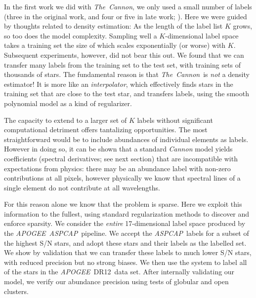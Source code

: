 \documentclass[12pt,preprint]{aastex}
\newcommand{\project}[1]{\textsl{#1}}
\newcommand{\TheCannon}{\project{The~Cannon}}
\newcommand{\acronym}[1]{{\small{#1}}}
\newcommand{\apogee}{\project{\acronym{APOGEE}}}
\newcommand{\aspcap}{\project{\acronym{ASPCAP}}}
\newcommand{\dr}{\acronym{DR12}}
\begin{document}





In the first work we did with \TheCannon, we only used a small number of labels
(three in the original work, and four or five in late work; \citealt{tc, age}). 
Here we were guided by thoughts related to density estimation: As the length of 
the label list $K$ grows, so too does the model complexity.  Sampling well a 
$K$-dimensional label space takes a training set the size of which scales 
exponentially (or worse) with $K$.  Subsequent experiments, however, did not 
bear this out. We found that we can transfer many labels from the training set 
to the test set, with training sets of thousands of stars.  The fundamental 
reason is that \TheCannon\ is \emph{not} a density estimator!  It is more like 
an \emph{interpolator}, which effectively finds stars in the training set that 
are close to the test star, and transfers labels, using the smooth polynomial 
model as a kind of regularizer.


The capacity to extend to a larger set of $K$ labels without significant
computational detriment offers tantalizing opportunities.  The most 
straightforward would be to include abundances of individual elements as labels.
However in doing so, it can be shown that a standard \emph{Cannon} model yields
coefficients (spectral derivatives; see next section) that are incompatible with expectations
from physics: there may be an abundance label with non-zero contributions at all
pixels, however physically we know that spectral lines of a single element do not 
contribute at all wavelengths. 


For this reason alone we know that the problem is sparse.  Here we exploit this 
information to the fullest, using standard regularization methods to discover
and enforce sparsity. We consider the \emph{entire} 17-dimensional label space 
produced by the \apogee\ \aspcap\ pipeline.  We accept the \aspcap\ labels for 
a subset of the highest S/N stars, and adopt these stars and their labels as the
labelled set.  We show by validation that we can transfer these labels to much 
lower S/N stars, with reduced precision but no strong biases.  We then use the
system to label all of the stars in the \apogee\ \dr\ data set.  After
internally validating our model, we verify our abundance precision using tests
of globular and open clusters.
\end{document}
